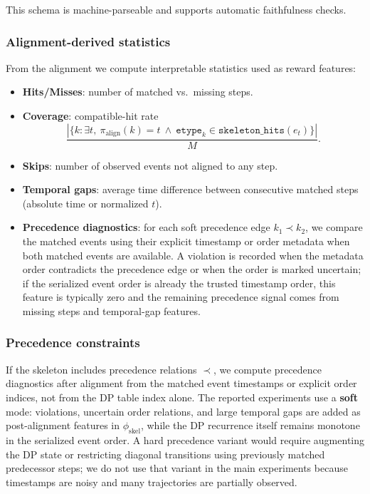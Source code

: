 \documentclass{article}
\begin{document}
This schema is machine-parseable and supports automatic faithfulness checks.

\subsubsection{Alignment-derived statistics}
\label{sec:app_alignment_stats}

From the alignment we compute interpretable statistics used as reward features:
\begin{itemize}
    \item \textbf{Hits/Misses}: number of matched vs.\ missing steps.
    \item \textbf{Coverage}: compatible-hit rate
\[
\frac{
|\{k:\exists t,\ \pi_{\mathrm{align}}(k)=t
\ \wedge\
\texttt{etype}_k\in\texttt{skeleton\_hits}(e_t)\}|
}{M}.
\]
    \item \textbf{Skips}: number of observed events not aligned to any step.
    \item \textbf{Temporal gaps}: average time difference between consecutive matched steps (absolute time or normalized $t$).
    \item \textbf{Precedence diagnostics}: for each soft precedence edge $k_1\prec k_2$, we compare the matched events using their explicit timestamp or order metadata when both matched events are available. 
    A violation is recorded when the metadata order contradicts the precedence edge or when the order is marked uncertain; if the serialized event order is already the trusted timestamp order, this feature is typically zero and the remaining precedence signal comes from missing steps and temporal-gap features.
\end{itemize}

\subsubsection{Precedence constraints}
\label{sec:app_alignment_prec}

If the skeleton includes precedence relations $\prec$, we compute precedence diagnostics after alignment from the matched event timestamps or explicit order indices, not from the DP table index alone.
The reported experiments use a \textbf{soft} mode: violations, uncertain order relations, and large temporal gaps are added as post-alignment features in $\phi_{\text{skel}}$, while the DP recurrence itself remains monotone in the serialized event order.
A hard precedence variant would require augmenting the DP state or restricting diagonal transitions using previously matched predecessor steps; we do not use that variant in the main experiments because timestamps are noisy and many trajectories are partially observed.
\end{document}
